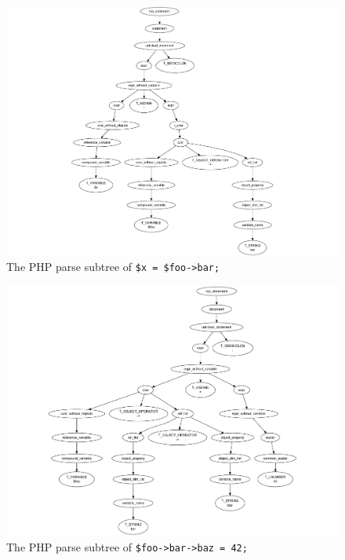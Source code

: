 \begin{figure}[htb]
  \begin{center}
    \includegraphics[trim = 40mm 0mm 0mm 10mm, scale=0.9]{images/one-level-field-access-right}
   \caption{The PHP parse subtree of \texttt{\$x = \$foo->bar;}}
   \label{fig:one-level-field-access-right}
  \end{center}
\end{figure}

\begin{figure}[htb]
  \begin{center}
    \includegraphics[trim = 50mm 0mm 0mm 25mm, scale=0.75]{images/multi-level-field-access-left}
   \caption{The PHP parse subtree of \texttt{\$foo->bar->baz = 42;}}
   \label{fig:multi-level-field-access-left}
  \end{center}
\end{figure}

